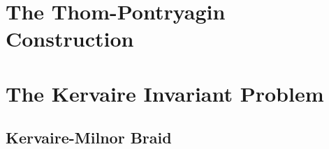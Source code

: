 \section{The Thom-Pontryagin Construction}\label{sec:thom-pontryagin}

\section{The Kervaire Invariant Problem}\label{sec:kervaire-invariant-problem}

\subsection{Kervaire-Milnor Braid}\label{sec:kervaire-milnor-braid}
